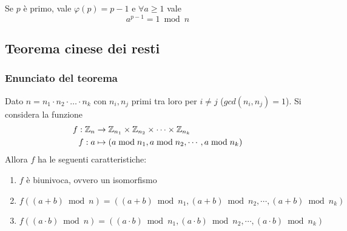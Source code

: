 \begin{corollario}
    \label{cor:piccolo_fermat}
    Se $p$ è primo, vale $
    \varphi (p) = p-1
    $ e $
    \forall a \geq 1
    $ vale
    \begin{equation*}
        a^{p-1} = 1 \bmod n 
    \end{equation*}
\end{corollario}

\subsection{Teorema cinese dei resti}

\subsubsection{Enunciato del teorema}

\begin{theorem}
    \label{teo:cinese_resti}
    Dato $n = 
        n_1 \cdot
        n_2 \cdot
        \ldots
        \cdot
        n_k
    $ con $
        n_i, n_j
    $ primi tra loro per $i \ne j$ ($
        gcd(
            n_i, n_j
        ) = 1
    $).
    Si considera la funzione
    \begin{align*}
        f
        :
        \mathbb{Z}_{n} 
        &
        \to
        \mathbb{Z}_{n_1} \times
        \mathbb{Z}_{n_2} \times
        \cdots
        \times
        \mathbb{Z}_{n_k}
        \\
        f
        :
        a
        &
        \mapsto
        \left( 
            a \bmod n_1,
            a \bmod n_2,
            \cdots,
            a \bmod n_k
        \right)
    \end{align*}
    Allora $f$ ha le seguenti caratteristiche:
    \begin{enumerate}
        \item $f$ è biunivoca, ovvero un isomorfismo
        \item $f
            \left( 
                \left( a+b \right) \bmod n 
            \right)
            =
            \left( 
                \left( a+b \right) \bmod n_1,
                \left( a+b \right) \bmod n_2,
                \cdots,
                \left( a+b \right) \bmod n_k
            \right)
            $
        \item $f
            \left( 
                \left( a \cdot b \right) \bmod n 
            \right)
            =
            \left( 
                \left( a \cdot b \right) \bmod n_1,
                \left( a \cdot b \right) \bmod n_2,
                \cdots,
                \left( a \cdot b \right) \bmod n_k
            \right)
            $
    \end{enumerate}
\end{theorem}

